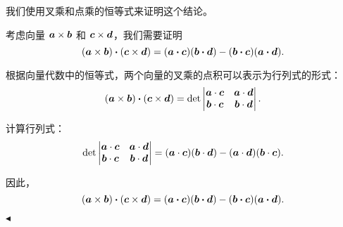 \documentclass[11pt]{article}
\newenvironment{question}[2][Question]{\begin{trivlist}
\item[\hskip \labelsep {\bfseries #1}\hskip \labelsep {\bfseries #2.}]}{\hfill$\blacktriangleleft$\end{trivlist}}
\begin{document}
\begin{question}{4 (9') (内积)}
    我们使用叉乘和点乘的恒等式来证明这个结论。
    
    考虑向量 \(\vb*{a} \times \vb*{b}\) 和 \(\vb*{c} \times \vb*{d}\)，我们需要证明
    \[
    (\vb*{a} \times \vb*{b}) \vdot (\vb*{c} \times \vb*{d}) = (\vb*{a} \vdot \vb*{c}) (\vb*{b} \vdot \vb*{d}) - (\vb*{b} \vdot \vb*{c}) (\vb*{a} \vdot \vb*{d}).
    \]
    
    根据向量代数中的恒等式，两个向量的叉乘的点积可以表示为行列式的形式：
    \[
    (\vb*{a} \times \vb*{b}) \vdot (\vb*{c} \times \vb*{d}) = \det \begin{vmatrix}
    \vb*{a} \cdot \vb*{c} & \vb*{a} \cdot \vb*{d} \\
    \vb*{b} \cdot \vb*{c} & \vb*{b} \cdot \vb*{d}
    \end{vmatrix}.
    \]
    
    计算行列式：
    \[
    \det \begin{vmatrix}
    \vb*{a} \cdot \vb*{c} & \vb*{a} \cdot \vb*{d} \\
    \vb*{b} \cdot \vb*{c} & \vb*{b} \cdot \vb*{d}
    \end{vmatrix} = (\vb*{a} \cdot \vb*{c})(\vb*{b} \cdot \vb*{d}) - (\vb*{a} \cdot \vb*{d})(\vb*{b} \cdot \vb*{c}).
    \]
    
    因此，
    \[
    (\vb*{a} \times \vb*{b}) \vdot (\vb*{c} \times \vb*{d}) = (\vb*{a} \vdot \vb*{c}) (\vb*{b} \vdot \vb*{d}) - (\vb*{b} \vdot \vb*{c}) (\vb*{a} \vdot \vb*{d}).
    \]
    

    \end{question}
    
\end{document}
